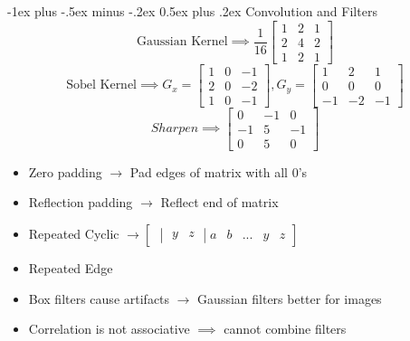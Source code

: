 \documentclass[10pt,landscape]{article}
\makeatletter
\renewcommand{\section}{\@startsection{section}{1}{0mm}%
                                {-1ex plus -.5ex minus -.2ex}%
                                {0.5ex plus .2ex}%
                                {\normalfont\large\bfseries}}
\makeatother
\begin{document}
\raggedright
\footnotesize
\begin{multicols}{3}


\setlength{\premulticols}{1pt}
\setlength{\postmulticols}{1pt}
\setlength{\multicolsep}{1pt}
\setlength{\columnsep}{2pt}

\section{Convolution and Filters}
\[
\text{Gaussian Kernel} \implies \frac{1}{16}\begin{bmatrix} 1 & 2 & 1\\ 2&4&2\\1&2&1\end{bmatrix}
\]
\[
\text{Sobel Kernel} \implies 
G_x = \begin{bmatrix} 1 & 0 & -1\\ 2&0&-2\\1&0&-1\end{bmatrix},
G_y = \begin{bmatrix} 1 & 2 & 1\\ 0&0&0\\-1&-2&-1\end{bmatrix}
\]
\[
Sharpen \implies \begin{bmatrix} 0&-1&0 \\ -1&5&-1 \\ 0&5&0 \end{bmatrix}
\]

\begin{itemize}
        \item Zero padding $\rightarrow$ Pad edges of matrix with all 0's
        \item Reflection padding $\rightarrow$ Reflect end of matrix 
        \item Repeated Cyclic $\rightarrow \begin{bmatrix} {\begin{vmatrix} y & z \end{vmatrix}} a & b &...&y&z \end{bmatrix}$
        \item Repeated Edge
        \item Box filters cause artifacts $\rightarrow$ Gaussian filters better for images
        \item Correlation is not associative $\implies$ cannot combine filters
\end{itemize}


\end{multicols}
\end{document}

